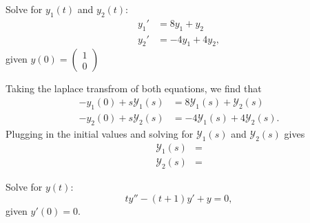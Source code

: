 \begin{example}
    Solve for $y_1(t)$ and $y_2(t)$:
    \begin{align*}
        y_1' &= 8y_1 + y_2 \\
        y_2' &= -4y_1 + 4y_2,
    \end{align*}
    given $y(0) = \begin{pmatrix} 1 \\ 0 \end{pmatrix}$
\end{example}
\begin{soln}
    Taking the laplace transfrom of both equations, we find that 
    \begin{align*}
        -y_1(0)+s\mathcal{Y}_1(s) &= 8\mathcal{Y}_1(s) + \mathcal{Y}_2(s) \\
        -y_2(0)+s\mathcal{Y}_2(s) &= -4\mathcal{Y}_1(s)+4\mathcal{Y}_2(s).
    \end{align*}
    Plugging in the initial values and solving for $\mathcal{Y}_1(s)$ and
    $\mathcal{Y}_2(s)$ gives
    \begin{align*}
        \mathcal{Y}_1(s) &= \\
        \mathcal{Y}_2(s) &=
    \end{align*}
\end{soln}

\begin{example}
    Solve for $y(t)$:
    $$ty''-(t+1)y'+ y = 0,$$
    given $y'(0)=0$.
\end{example}

